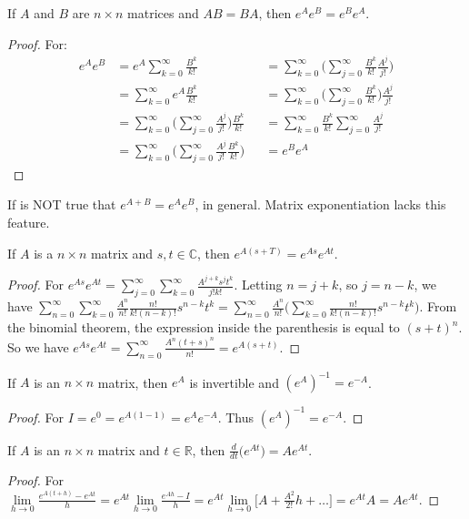 \documentclass[../main.tex]{subfiles}
\begin{document}
%
\begin{theorem}
If $A$ and $B$ are $n\times n$ matrices and $AB = BA$, then $e^{A}e^{B} = e^{B}e^{A}$.
\end{theorem}
\begin{proof}
For:
\begin{align*}
e^A e^B &= e^A\sum_{k=0}^{\infty} \frac{B^k}{k!} & &=\sum_{k=0}^{\infty}\big(\sum_{j=0}^{\infty} \frac{B^k}{k!}\frac{A^j}{j!}\big) \\
&= \sum_{k=0}^{\infty} e^A\frac{B^k}{k!} & &=\sum_{k=0}^{\infty}\big(\sum_{j=0}^{\infty} \frac{B^k}{k!}\big)\frac{A^j}{j!} \\
&= \sum_{k=0}^{\infty} \big(\sum_{j=0}^{\infty} \frac{A^j}{j!}\big) \frac{B^k}{k!} & &= \sum_{k=0}^{\infty} \frac{B^k}{k!} \sum_{j=0}^{\infty} \frac{A^j}{j!} \\
&= \sum_{k=0}^{\infty}\big(\sum_{j=0}^{\infty} \frac{A^j}{j!}\frac{B^k}{k!}\big) & &= e^Be^A
\end{align*}
\end{proof}
%
If is NOT true that $e^{A+B} = e^Ae^B$, in general. Matrix exponentiation lacks this feature.
%
\begin{theorem}
If $A$ is a $n\times n$ matrix and $s,t\in \mathbb{C}$, then $e^{A(s+T)} = e^{As}e^{At}$.
\end{theorem}
\begin{proof}
For $e^{As}e^{At} = \sum_{j=0}^{\infty} \sum_{k=0}^{\infty} \frac{A^{j+k}s^jt^k}{j!k!}$. Letting $n = j+k$, so $j = n-k$, we have $\sum_{n=0}^{\infty} \sum_{k=0}^{\infty} \frac{A^n}{n!}\frac{n!}{k!(n-k)!}s^{n-k}t^k = \sum_{n=0}^{\infty}\frac{A^n}{n!}\big(\sum_{k=0}^{\infty} \frac{n!}{k!(n-k)!}s^{n-k}t^k\big)$. From the binomial theorem, the expression inside the parenthesis is equal to $(s+t)^n$. So we have $e^{As}e^{At}=\sum_{n=0}^{\infty} \frac{A^n(t+s)^n}{n!} = e^{A(s+t)}$.
\end{proof}
%
\begin{theorem}
If $A$ is an $n\times n$ matrix, then $e^A$ is invertible and $(e^A)^{-1} = e^{-A}$.
\end{theorem}
\begin{proof}
For $I = e^{0} = e^{A(1-1)} = e^Ae^{-A}$. Thus $(e^{A})^{-1} = e^{-A}$.
\end{proof}
%
\begin{theorem}
If $A$ is an $n\times n$ matrix and $t\in \mathbb{R}$, then $\frac{d}{dt}\big(e^{At}\big) = Ae^{At}$.
\end{theorem}
\begin{proof}
For $\underset{h\rightarrow 0}\lim \frac{e^{A(t+h)}-e^{At}}{h} = e^{At}\underset{h\rightarrow 0}\lim \frac{e^{Ah}-I}{h} = e^{At}\underset{h\rightarrow 0}\lim\big[A+\frac{A^2}{2!}h+\hdots\big] = e^{At}A = Ae^{At}$.
\end{proof}
\end{document}
